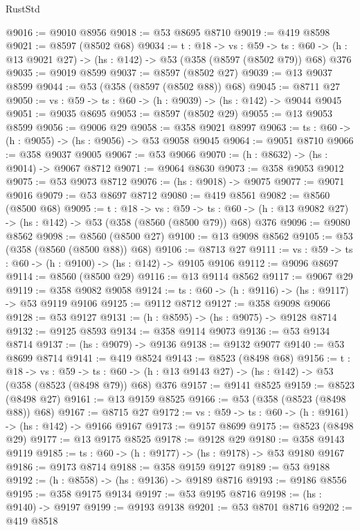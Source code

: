 \begin{lexlean}{RustStd}
\begin{coremodule}
@9016 := @9010 @8956
@9018 := @53 @8695 @8710
@9019 := @419 @8598
@9021 := @8597 (@8502 @68)
@9034 := {t : @18} ->
  {vs : @59} ->
  {ts : @60} -> (h : @13 @9021 @27) -> (hs : @142) -> @53 (@358 (@8597 (@8502 @79)) @68) @376
@9035 := @9019 @8599
@9037 := @8597 (@8502 @27)
@9039 := @13 @9037 @8599
@9044 := @53 (@358 (@8597 (@8502 @88)) @68)
@9045 := @8711 @27
@9050 := {vs : @59} -> {ts : @60} -> (h : @9039) -> (hs : @142) -> @9044 @9045
@9051 := @9035 @8695
@9053 := @8597 (@8502 @29)
@9055 := @13 @9053 @8599
@9056 := @9006 @29
@9058 := @358 @9021 @8997
@9063 := {ts : @60} -> (h : @9055) -> (hs : @9056) -> @53 @9058 @9045
@9064 := @9051 @8710
@9066 := @358 @9037 @9005
@9067 := @53 @9066
@9070 := (h : @8632) -> (hs : @9014) -> @9067 @8712
@9071 := @9064 @8630
@9073 := @358 @9053 @9012
@9075 := @53 @9073 @8712
@9076 := (hs : @9018) -> @9075
@9077 := @9071 @9016
@9079 := @53 @8697 @8712
@9080 := @419 @8561
@9082 := @8560 (@8500 @68)
@9095 := {t : @18} ->
  {vs : @59} ->
  {ts : @60} -> (h : @13 @9082 @27) -> (hs : @142) -> @53 (@358 (@8560 (@8500 @79)) @68) @376
@9096 := @9080 @8562
@9098 := @8560 (@8500 @27)
@9100 := @13 @9098 @8562
@9105 := @53 (@358 (@8560 (@8500 @88)) @68)
@9106 := @8713 @27
@9111 := {vs : @59} -> {ts : @60} -> (h : @9100) -> (hs : @142) -> @9105 @9106
@9112 := @9096 @8697
@9114 := @8560 (@8500 @29)
@9116 := @13 @9114 @8562
@9117 := @9067 @29
@9119 := @358 @9082 @9058
@9124 := {ts : @60} -> (h : @9116) -> (hs : @9117) -> @53 @9119 @9106
@9125 := @9112 @8712
@9127 := @358 @9098 @9066
@9128 := @53 @9127
@9131 := (h : @8595) -> (hs : @9075) -> @9128 @8714
@9132 := @9125 @8593
@9134 := @358 @9114 @9073
@9136 := @53 @9134 @8714
@9137 := (hs : @9079) -> @9136
@9138 := @9132 @9077
@9140 := @53 @8699 @8714
@9141 := @419 @8524
@9143 := @8523 (@8498 @68)
@9156 := {t : @18} ->
  {vs : @59} ->
  {ts : @60} -> (h : @13 @9143 @27) -> (hs : @142) -> @53 (@358 (@8523 (@8498 @79)) @68) @376
@9157 := @9141 @8525
@9159 := @8523 (@8498 @27)
@9161 := @13 @9159 @8525
@9166 := @53 (@358 (@8523 (@8498 @88)) @68)
@9167 := @8715 @27
@9172 := {vs : @59} -> {ts : @60} -> (h : @9161) -> (hs : @142) -> @9166 @9167
@9173 := @9157 @8699
@9175 := @8523 (@8498 @29)
@9177 := @13 @9175 @8525
@9178 := @9128 @29
@9180 := @358 @9143 @9119
@9185 := {ts : @60} -> (h : @9177) -> (hs : @9178) -> @53 @9180 @9167
@9186 := @9173 @8714
@9188 := @358 @9159 @9127
@9189 := @53 @9188
@9192 := (h : @8558) -> (hs : @9136) -> @9189 @8716
@9193 := @9186 @8556
@9195 := @358 @9175 @9134
@9197 := @53 @9195 @8716
@9198 := (hs : @9140) -> @9197
@9199 := @9193 @9138
@9201 := @53 @8701 @8716
@9202 := @419 @8518

\end{coremodule}
\end{lexlean}
